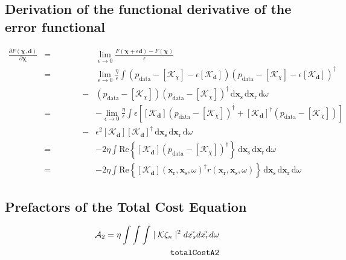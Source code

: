 \documentclass[10pt,a4paper]{article}
\newcommand{\partder}[2]{\ensuremath{\frac{\partial #1}{\partial #2}}}
\newcommand{\df}[1]{\, \ensuremath{\mbox{d}#1}}
\newcommand{\real}[1]{\text{Re} \left\{ #1 \right\}}
\newcommand{\xs}{\mathbf{x}_\text{s}}
\newcommand{\xr}{\mathbf{x}_\text{r}}
\begin{document}
\subsection{Derivation of the functional derivative of the error functional}
\label{deriveerrorfunctional}
\begin{eqnarray*}
\partder{F(\mathbf{\chi}, \mathbf{d})}{\mathbf{\chi}} & = &
\lim_{\epsilon \rightarrow 0} \frac{F(\mathbf{\chi} + \epsilon
\mathbf{d}) - F(\mathbf{\chi})}{\epsilon} \\
& = & \lim_{\epsilon \rightarrow 0} \frac{\eta}{\epsilon} \int
\left(p_{\text{data}} - \left[\mathcal{K}_\chi \right] - \epsilon
\left[\mathcal{K}_\mathbf{d} \right] \right) \left(p_{\text{data}} -
\left[\mathcal{K}_\chi \right] - \epsilon \left[\mathcal{K}_\mathbf{d}
\right] \right)^{\dagger}\\
& \, \, \, \, \, \, \, \, \, \, \, \, \, \, \, \, \, \, \, \, \, \, \,
\, \, \, \, - & \left(p_{\text{data}} - \left[\mathcal{K}_\chi \right]
\right) \left(p_{\text{data}} - \left[\mathcal{K}_\chi \right]
\right)^{\dagger} \df{\xs} \df{\xr} \df{\omega} \\
& = & -\lim_{\epsilon \rightarrow 0} \frac{\eta}{\epsilon} \int
\epsilon \left[ \left[\mathcal{K}_\mathbf{d} \right]
\left(p_{\text{data}} - \left[\mathcal{K}_\chi \right]
\right)^{\dagger} + \left[\mathcal{K}_\mathbf{d} \right]^{\dagger}
\left(p_{\text{data}} - \left[\mathcal{K}_\chi \right] \right) \right]
\\
& \, \, \, \, \, \, \, \, \, \, \, \, \, \, \, \, \, \, \, \, \, \, \,
\, \, \, \, - & \epsilon^2 \left[\mathcal{K}_\mathbf{d} \right]
\left[\mathcal{K}_\mathbf{d} \right]^{\dagger} \df{\xs} \df{\xr}
\df{\omega} \\
& = & -2 \eta \int \real{\left[\mathcal{K}_\mathbf{d} \right]
\left(p_{\text{data}} - \left[\mathcal{K}_\chi \right]
\right)^{\dagger}} \df{\xs} \df{\xr} \df{\omega} \\
& = & -2 \eta \int \real{\left[\mathcal{K}_\mathbf{d} \right](\xr,
\xs, \omega)^{\dagger} r (\xr, \xs, \omega)} \df{\xs} \df{\xr}
\df{\omega}
\end{eqnarray*}

\subsection{Prefactors of the Total Cost Equation}
\label{totalcostprefactors}
\begin{align} \label{eq:totalCostA2} \mathcal{A}_2 = \eta \int \int \int
\mid \mathcal{K} \zeta_n \mid^2 d\vec{x_s}d\vec{x_r}d\omega\\
\tag*{\texttt{totalCostA2}}
\end{align}
\end{document}
